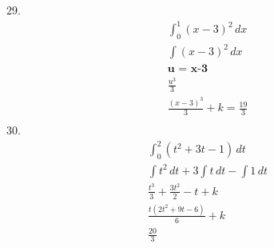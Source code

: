 \documentclass{article}
\begin{document}
29.
\begin{gather*}
    \int_{0}^{1} (x-3)^2\, dx
\\
    \int (x-3)^2\,dx
\\
    \textbf{u = x-3}
\\
    \frac{u^3}{3}
\\
    \frac{(x-3)^3}{3} + k = \frac{19}{3}
\\
\end{gather*}
30.
\begin{gather*}
    \int_{0}^{2} (t^2 + 3t - 1)\, dt
\\
    \int t^2\,dt + 3\int t\,dt - \int 1\,dt
\\
    \frac{t^3}{3} + \frac{3t^2}{2} - t + k
\\
    \frac{t(2t^2 + 9t - 6)}{6} + k
\\
    \frac{20}{3}
\\
\end{gather*}
\end{document}

